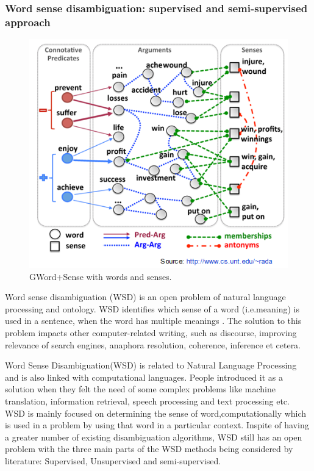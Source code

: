 \subsubsection*{Word sense disambiguation: supervised and semi-supervised approach}

\begin{figure}[tbh]
	\begin{center}
		\includegraphics[width=\columnwidth]{Union_Background_Chart_WSD}
	\end{center}
	\caption{GWord+Sense with words and senses. \label{fig1}}
\end{figure}

Word sense disambiguation (WSD) is an open problem of natural language processing and ontology. WSD identifies which sense of a word (i.e.meaning) is used in a sentence, when the word has multiple meanings \cite{Du2013}. The solution to this problem impacts other computer-related writing, such as discourse, improving relevance of search engines, anaphora resolution, coherence, inference et cetera.

Word Sense Disambiguation(WSD) is related to Natural Language Processing and is also linked with computational languages. People introduced it as a solution when they felt the need of some complex problems like machine translation, information retrieval, speech processing and text processing etc. WSD is mainly focused on determining the sense of word,computationally which is used in a problem by using that word in a particular context. Inspite of having a greater number of existing disambiguation algorithms, WSD still has an open problem with the three main parts of the WSD methods being considered by literature: Supervised, Unsupervised and semi-supervised. 


